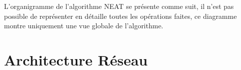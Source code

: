 \documentclass{article}
\begin{document}
L'organigramme de l'algorithme NEAT se présente comme suit, il n'est pas possible de représenter en détaille toutes les opérations faites, ce diagramme montre uniquement une vue globale de l'algorithme.
\newpage

\section{Architecture Réseau}
\end{document}
